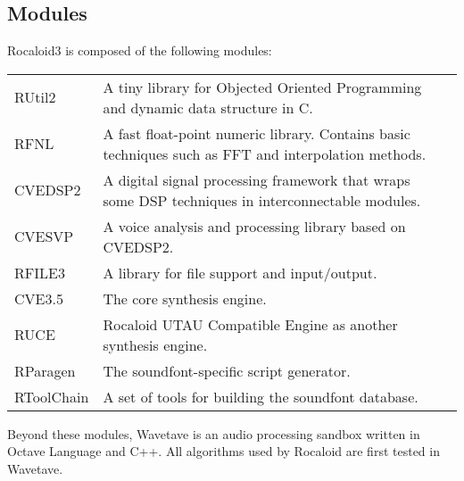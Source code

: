         \newpage

\subsection{Modules}\indent

        Rocaloid3 is composed of the following modules:
        
        \bigskip
        \begin{tabular}{lll}
        	RUtil2 & \parbox{9.5cm}{A tiny library for Objected Oriented Programming and dynamic data structure in C.}\\
        	RFNL & \parbox{9.5cm}{A fast float-point numeric library. Contains basic techniques such as FFT and interpolation methods.}\\
        	CVEDSP2 & \parbox{9.5cm}{A digital signal processing framework that wraps some DSP techniques in interconnectable modules.}\\
        	CVESVP & \parbox{9.5cm}{A voice analysis and processing library based on CVEDSP2.}\\
        	RFILE3 & \parbox{9.5cm}{A library for file support and input/output.}\\
        	CVE3.5 & \parbox{9.5cm}{The core synthesis engine.}\\
        	RUCE & \parbox{9.5cm}{Rocaloid UTAU Compatible Engine as another synthesis engine.}\\
        	RParagen & \parbox{9.5cm}{The soundfont-specific script generator.}\\
        	RToolChain & \parbox{9.5cm}{A set of tools for building the soundfont database.}\\
        \end{tabular}
        \bigskip
        
        Beyond these modules, Wavetave is an audio processing sandbox written in Octave Language and C++. All algorithms used by Rocaloid are first tested in Wavetave.
        
        \newpage
        
        
        \newpage



